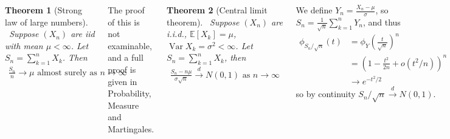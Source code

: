 \documentclass{tikzposter} %
\DeclareMathOperator{\var}{Var}
\newtheorem{theorem}{Theorem}
\newtheorem{definition}{Definition}
\begin{document}
\begin{columns}
{  \begin{theorem}[Strong law of large numbers]
    \ Suppose $(X_{n})$ are iid with mean $\mu < \infty$. Let $S_{n} = \sum_{k=1}^{n} X_{k}$. Then
    \begin{align*}
      \frac{S_{n}}{n} \to \mu \,\,\textrm{almost surely as}\,\, n \to \infty
    \end{align*}
  \end{theorem}
  \hphantom{}

  The proof of this is not examinable, and a full proof is given in Probability, Measure and Martingales. \\

  \begin{theorem}[Central limit theorem]
    \ Suppose $(X_{n})$ are i.i.d., $\mathbb{E}[X_{k}] = \mu$, $\var X_{k} = \sigma^{2} < \infty$. Let $S_{n} = \sum_{k=1}^{n} X_{k}$, then
    \begin{align*}
      \frac{S_{n}-n\mu}{\sigma\sqrt{n}} \overset{d}{\longrightarrow} N(0,1) \,\, \textrm{as $n \to \infty$}
    \end{align*}
  \end{theorem}
  \hphantom{}

  We define $Y_{n} = \frac{X_{n} - \mu}{\sigma}$, so $S_{n} = \frac{1}{\sqrt{n}}\sum_{k=1}^{n} Y_{n}$, and thus
  \begin{align*}
    \phi_{S_{n}/\sqrt{n}}(t) &= \phi_{Y}(\frac{t}{\sqrt{n}})^{n} \\
                 &= \left(1 - \frac{t^{2}}{2n} + o(t^{2}/n)\right)^{n} \\
    &\to e^{-t^{2}/2}
  \end{align*}
  so by continuity $S_{n}/\sqrt{n} \overset{d}{\to} N(0,1)$.
}

\end{columns}
\end{document}
